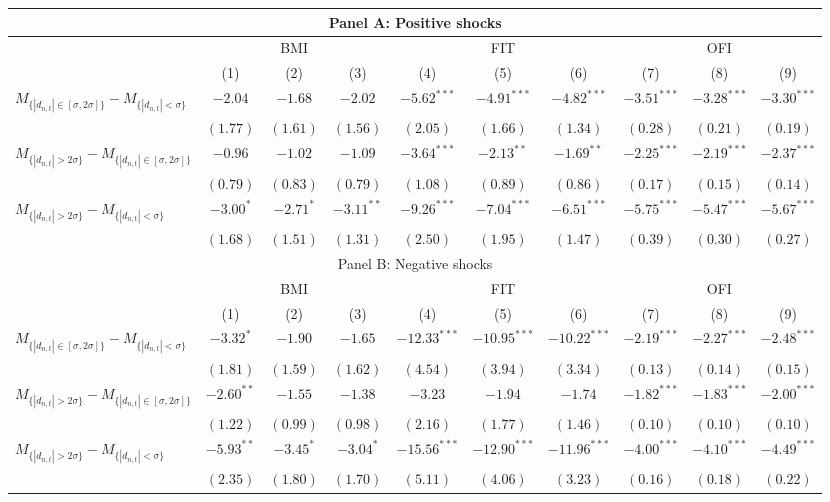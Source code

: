 \begin{tabular}{lccccccccc}
  \hline \multicolumn{10}{c}{Panel A: Positive shocks} \\
 \hline
  & \multicolumn{3}{c}{BMI} & \multicolumn{3}{c}{FIT} & \multicolumn{3}{c}{OFI} \\ 
  \cmidrule(l){2-4} \cmidrule(l){5-7} \cmidrule(l){8-10} 
  & (1) & (2) & (3) & (4) & (5) & (6) & (7) & (8) & (9) \\ 
  $M_{\{|d_{n,t}| \in [\sigma, 2\sigma]\}} - M_{\{|d_{n,t}| < \sigma\}}$ & $-2.04$ & $-1.68$ & $-2.02$ & $-5.62^{***}$ & $-4.91^{***}$ & $-4.82^{***}$ & $-3.51^{***}$ & $-3.28^{***}$ & $-3.30^{***}$ \\ 
   & $(1.77)$ & $(1.61)$ & $(1.56)$ & $(2.05)$ & $(1.66)$ & $(1.34)$ & $(0.28)$ & $(0.21)$ & $(0.19)$ \\ 
  $M_{\{|d_{n,t}| > 2 \sigma\}} - M_{\{|d_{n,t}| \in [\sigma, 2\sigma]\}}$ & $-0.96$ & $-1.02$ & $-1.09$ & $-3.64^{***}$ & $-2.13^{**}$ & $-1.69^{**}$ & $-2.25^{***}$ & $-2.19^{***}$ & $-2.37^{***}$ \\ 
   & $(0.79)$ & $(0.83)$ & $(0.79)$ & $(1.08)$ & $(0.89)$ & $(0.86)$ & $(0.17)$ & $(0.15)$ & $(0.14)$ \\ 
  $M_{\{|d_{n,t}| > 2 \sigma\}} - M_{\{|d_{n,t}| < \sigma\}}$ & $-3.00^{*}$ & $-2.71^{*}$ & $-3.11^{**}$ & $-9.26^{***}$ & $-7.04^{***}$ & $-6.51^{***}$ & $-5.75^{***}$ & $-5.47^{***}$ & $-5.67^{***}$ \\ \vspace{5pt} 
   & $(1.68)$ & $(1.51)$ & $(1.31)$ & $(2.50)$ & $(1.95)$ & $(1.47)$ & $(0.39)$ & $(0.30)$ & $(0.27)$ \\ 
  \hline \multicolumn{10}{c}{Panel B: Negative shocks} \\
 \hline
  & \multicolumn{3}{c}{BMI} & \multicolumn{3}{c}{FIT} & \multicolumn{3}{c}{OFI} \\ 
  \cmidrule(l){2-4} \cmidrule(l){5-7} \cmidrule(l){8-10} 
  & (1) & (2) & (3) & (4) & (5) & (6) & (7) & (8) & (9) \\ 
  $M_{\{|d_{n,t}| \in [\sigma, 2\sigma]\}} - M_{\{|d_{n,t}| < \sigma\}}$ & $-3.32^{*}$ & $-1.90$ & $-1.65$ & $-12.33^{***}$ & $-10.95^{***}$ & $-10.22^{***}$ & $-2.19^{***}$ & $-2.27^{***}$ & $-2.48^{***}$ \\ 
   & $(1.81)$ & $(1.59)$ & $(1.62)$ & $(4.54)$ & $(3.94)$ & $(3.34)$ & $(0.13)$ & $(0.14)$ & $(0.15)$ \\ 
  $M_{\{|d_{n,t}| > 2 \sigma\}} - M_{\{|d_{n,t}| \in [\sigma, 2\sigma]\}}$ & $-2.60^{**}$ & $-1.55$ & $-1.38$ & $-3.23$ & $-1.94$ & $-1.74$ & $-1.82^{***}$ & $-1.83^{***}$ & $-2.00^{***}$ \\ 
   & $(1.22)$ & $(0.99)$ & $(0.98)$ & $(2.16)$ & $(1.77)$ & $(1.46)$ & $(0.10)$ & $(0.10)$ & $(0.10)$ \\ 
  $M_{\{|d_{n,t}| > 2 \sigma\}} - M_{\{|d_{n,t}| < \sigma\}}$ & $-5.93^{**}$ & $-3.45^{*}$ & $-3.04^{*}$ & $-15.56^{***}$ & $-12.90^{***}$ & $-11.96^{***}$ & $-4.00^{***}$ & $-4.10^{***}$ & $-4.49^{***}$ \\ \vspace{5pt} 
   & $(2.35)$ & $(1.80)$ & $(1.70)$ & $(5.11)$ & $(4.06)$ & $(3.23)$ & $(0.16)$ & $(0.18)$ & $(0.22)$ \\ 
   \hline 
\end{tabular}
